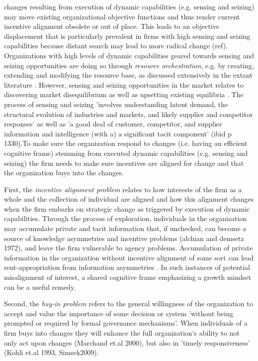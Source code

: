 changes resulting from execution of dynamic capabilities (e.g. sensing and seizing) may
move existing organizational objective functions and thus render current incentive
alignment obsolete or out of place. This leads to an objective displacement that is
particularly prevalent in firms with high sensing and seizing capabilities because distant
search may lead to more radical change (ref). Organizations with high levels of dynamic
capabilities geared towards sensing and seizing opportunities are doing so through
\emph{resource orchestration}, e.g. by creating, extending and modifying the resource
base, as discussed extensively in the extant literature
\citep{Helfat2007,DiStefano2014,Protogerou2012,Schilke2018}. However, sensing and seizing
opportunities in the market relates to discovering market disequilibrium
\citep{Kirzner1997} as well as upsetting existing equilibria \citep{Schumpeter1934}. The
process of sensing and seizing 'involves understanding latent demand, the structural
evolution of industries and markets, and likely supplier and competitor responses'
\citep[p. 1322]{Teece2007} as well as 'a good deal of customer, competitor, and supplier
information and intelligence (with a) a significant tacit component' (ibid p 1330).To make
sure the organization respond to changes (i.e. having an efficient cognitive frame)
stemming from executed dynamic capabilities (e.g. sensing and seizing) the firm needs to
make sure incentives are aligned for change and that the organization buys into the changes.

First, the \emph{incentive alignment problem} relates to how interests of the firm
as a whole and the collection of individual are aligned \cite{Gottschalg2007} and how this
alignment changes when the firm embarks on strategic change as triggered by execution of
dynamic capabilities. Through the process of exploration, individuals in the organization
may accumulate private and tacit information that, if unchecked, can become a source of
knowledge asymmetries and incentive problems (alchian and demsetz 1972), and leave the
firm vulnerable to agency problems. Accumulation of private information in the
organization without incentive alignment of some sort can lead rent-appropriation from
information asymmetries \citep{Blyler2003}. In such instances of potential misalignment of
interest, a shared cognitive frame emphasizing a growth mindset can be a useful remedy.

Second, the \emph{buy-in problem} refers to the general willingness of the organization to
accept and value the importance of some decision or system 'without being prompted or
required by formal governance mechanisms'\citep[p. 812]{Simsek2009}. When individuals of
a firm buys into changes they will enhance the full organization`s ability to not only act
upon changes (Marchand et.al 2000), but also in 'timely responsiveness' (Kohli et.al 1993,
Simsek2009). 

